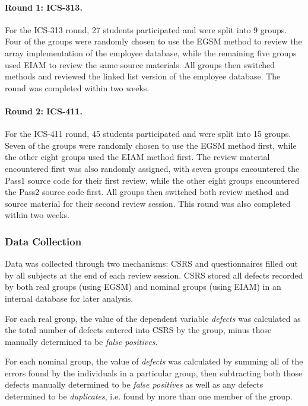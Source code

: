 \paragraph{Round 1: ICS-313.}

For the ICS-313 round, 27 students participated and were split into 9
groups. Four of the groups were randomly chosen to use the EGSM method to
review the array implementation of the employee database, while the remaining
five groups used EIAM to review the same source materials.  All groups then
switched methods and reviewed the linked list version of the employee
database. The round was completed within two weeks. 

\paragraph{Round 2: ICS-411.}

For the ICS-411 round, 45 students participated and were split into 15
groups. Seven of the groups were randomly chosen to use the EGSM method
first, while the other eight groups used the EIAM method first.  The 
review material encountered first was also randomly assigned, with seven
groups encountered the Pass1 source code for their first review, while the
other eight groups encountered the Pass2 source code first.  All groups
then switched both review method and source material for their second
review session. This round was also completed within two weeks. 

\subsubsection{Data Collection}

Data was collected through two mechanisms: CSRS and questionnaires filled
out by all subjects at the end of each review session.  CSRS stored
all defects recorded by both real groups (using EGSM) and nominal groups
(using EIAM) in an internal database for later analysis.

For each real group, the value of the dependent variable {\em defects} was
calculated as the total number of defects entered into CSRS by the group,
minus those manually determined to be {\em false positives}.

For each nominal group, the value of {\em defects} was calculated by summing
all of the errors found by the individuals in a particular group, then
subtracting both those defects manually determined to be {\em false
  positives} as well as any defects determined to be {\em duplicates},
i.e. found by more than one member of the group. 

